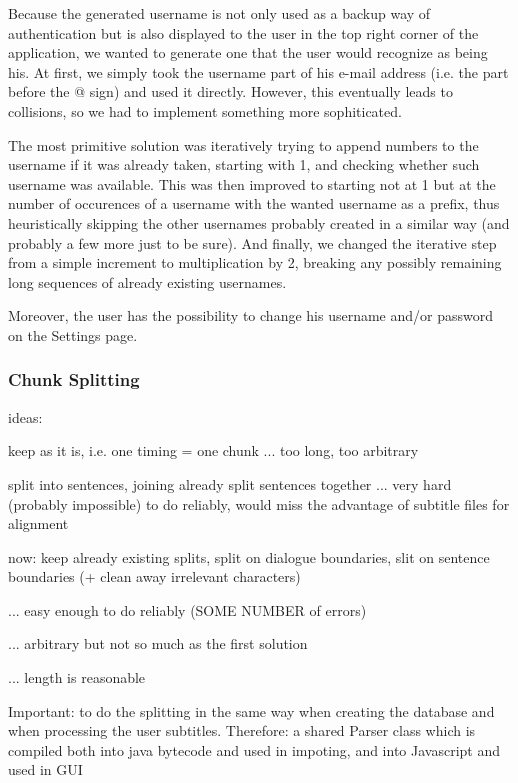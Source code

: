 Because the generated username is not only used as a backup way of authentication but is also displayed to the user in the top right corner of the application, we wanted to generate one that the user would recognize as being his. At first, we simply took the username part of his e-mail address (i.e. the part before the @ sign) and used it directly. However, this eventually leads to collisions, so we had to implement something more sophiticated.

The most primitive solution was iteratively trying to append numbers to the username if it was already taken, starting with 1, and checking whether such username was available. This was then improved to starting not at 1 but at the number of occurences of a username with the wanted username as a prefix, thus heuristically skipping the other usernames probably created in a similar way (and probably a few more just to be sure). And finally, we changed the iterative step from a simple increment to multiplication by 2, breaking any possibly remaining long sequences of already existing usernames.

Moreover, the user has the possibility to change his username and/or password on the Settings page.

\subsubsection{Chunk Splitting}


ideas:

keep as it is, i.e. one timing = one chunk ... too long, too arbitrary

split into sentences, joining already split sentences together ... very hard (probably impossible) to do reliably, would miss the advantage of subtitle files for alignment

now: keep already existing splits, split on dialogue boundaries, slit on sentence boundaries (+ clean away irrelevant characters)

... easy enough to do reliably (SOME NUMBER of errors)

... arbitrary but not so much as the first solution

... length is reasonable

Important: to do the splitting in the same way when creating the database and when processing the user subtitles.
Therefore: a shared Parser class which is compiled both into java bytecode and used in impoting, and into Javascript and used in GUI

